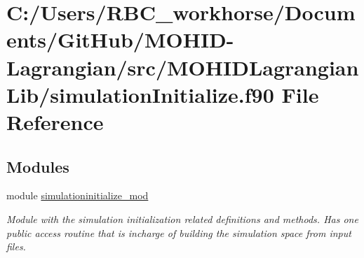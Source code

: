 \hypertarget{simulation_initialize_8f90}{}\section{C\+:/\+Users/\+R\+B\+C\+\_\+workhorse/\+Documents/\+Git\+Hub/\+M\+O\+H\+I\+D-\/\+Lagrangian/src/\+M\+O\+H\+I\+D\+Lagrangian\+Lib/simulation\+Initialize.f90 File Reference}
\label{simulation_initialize_8f90}
\subsection*{Modules}
\begin{DoxyCompactItemize}
\item 
module \mbox{\hyperlink{namespacesimulationinitialize__mod}{simulationinitialize\+\_\+mod}}
\begin{DoxyCompactList}\small\item\em Module with the simulation initialization related definitions and methods. Has one public access routine that is incharge of building the simulation space from input files. \end{DoxyCompactList}\end{DoxyCompactItemize}
